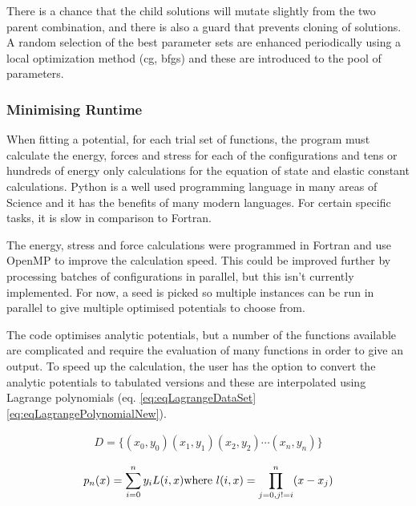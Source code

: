There is a chance that the child solutions will mutate slightly from the two parent combination, and there is also a guard that prevents cloning of solutions.  A random selection of the best parameter sets are enhanced periodically using a local optimization method (\acrshort{cg}, \acrshort{bfgs}) and these are introduced to the pool of parameters.



\subsubsection{Minimising Runtime}

When fitting a potential, for each trial set of functions, the program must calculate the energy, forces and stress for each of the configurations and tens or hundreds of energy only calculations for the equation of state and elastic constant calculations.  Python is a well used programming language in many areas of Science and it has the benefits of many modern languages.  For certain specific tasks, it is slow in comparison to Fortran.

The energy, stress and force calculations were programmed in Fortran and use OpenMP to improve the calculation speed.  This could be improved further by processing batches of configurations in parallel, but this isn't currently implemented.  For now, a seed is picked so multiple instances can be run in parallel to give multiple optimised potentials to choose from.

The code optimises analytic potentials, but a number of the functions available are complicated and require the evaluation of many functions in order to give an output.  To speed up the calculation, the user has the option to convert the analytic potentials to tabulated versions and these are interpolated using Lagrange polynomials (eq. \ref{eq:eqLagrangeDataSet} \ref{eq:eqLagrangePolynomialNew}).

\begin{equation}
\begin{split}
D = \lbrace \left(x_0, y_0 \right) \left(x_1, y_1 \right) \left(x_2, y_2 \right) \dotsm \left(x_n, y_n \right) \rbrace
\end{split}
\label{eq:eqLagrangeDataSet}
\end{equation}

\begin{equation}
\begin{split}
p_n (x) = \sum _{i=0} ^n y_i L(i, x) 
\textnormal{where    } l(i, x) = \prod _{j=0 , j!=i} ^n (x - x_j)
\end{split}
\label{eq:eqLagrangePolynomialNew}
\end{equation}

